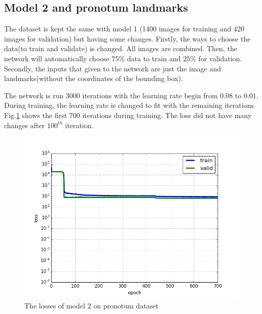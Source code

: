 \documentclass[12pt,a4paper]{article}
\begin{document}
\subsection{Model 2 and pronotum landmarks}
The dataset is kept the same with model 1 (1400 images for training and 420 images for validation) but having some changes. Firstly, the ways to choose the data(to train and validate) is changed. All images are combined. Then, the network will automatically choose $75 \%$ data to train and $25 \%$ for validation. Secondly, the inputs that given to the network are just the image and landmarks(without the coordinates of the bounding box).

The network is run 3000 iterations with the learning rate begin from $0.08$ to $0.01$. During training, the learning rate is changed to fit with the remaining iterations\cite{lecun2012efficient}. Fig.\ref{model2pl} shows the first 700 iterations during training. The loss did not have many changes after $100^{th}$ iteration.

\begin{figure}[h!]
	\centering
	\includegraphics[scale=0.4]{images/figure_1_loss_celia}
	\caption{The losses of model 2 on pronotum dataset}
	\label{model2pl}
\end{figure}
\end{document}
